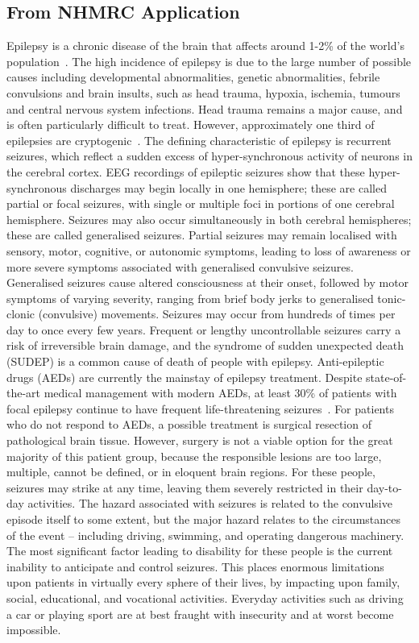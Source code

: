 \documentclass[]{article}
\begin{document}
\subsection{From NHMRC Application}
Epilepsy is a chronic disease of the brain that affects around 1-2\% of the world’s population~\cite{Beran1985,Dua2006}. The high incidence of epilepsy is due to the large number of possible causes including developmental abnormalities, genetic abnormalities, febrile convulsions and brain insults, such as head trauma, hypoxia, ischemia, tumours and central nervous system infections. Head trauma remains a major cause, and is often particularly difficult to treat. However, approximately one third of epilepsies are cryptogenic~\cite{Theodore2006}.
The defining characteristic of epilepsy is recurrent seizures, which reflect a sudden excess of hyper-synchronous activity of neurons in the cerebral cortex. EEG recordings of epileptic seizures show that these hyper-synchronous discharges may begin locally in one hemisphere; these are called partial or focal seizures, with single or multiple foci in portions of one cerebral hemisphere. Seizures may also occur simultaneously in both cerebral hemispheres; these are called generalised seizures. Partial seizures may remain localised with sensory, motor, cognitive, or autonomic symptoms, leading to loss of awareness or more severe symptoms associated with generalised convulsive seizures. Generalised seizures cause altered consciousness at their onset, followed by motor symptoms of varying severity, ranging from brief body jerks to generalised tonic-clonic (convulsive) movements. Seizures may occur from hundreds of times per day to once every few years. Frequent or lengthy uncontrollable seizures carry a risk of irreversible brain damage, and the syndrome of sudden unexpected death (SUDEP) is a common cause of death of people with epilepsy.
Anti-epileptic drugs (AEDs) are currently the mainstay of epilepsy treatment. Despite state-of-the-art medical management with modern AEDs, at least 30\% of patients with focal epilepsy continue to have frequent life-threatening seizures~\cite{Schmidt2005}. For patients who do not respond to AEDs, a possible treatment is surgical resection of pathological brain tissue.  However, surgery is not a viable option for the great majority of this patient group, because the responsible lesions are too large, multiple, cannot be defined, or in eloquent brain regions. For these people, seizures may strike at any time, leaving them severely restricted in their day-to-day activities. The hazard associated with seizures is related to the convulsive episode itself to some extent, but the major hazard relates to the circumstances of the event – including driving, swimming, and operating dangerous machinery. The most significant factor leading to disability for these people is the current inability to anticipate and control seizures. This places enormous limitations upon patients in virtually every sphere of their lives, by impacting upon family, social, educational, and vocational activities. Everyday activities such as driving a car or playing sport are at best fraught with insecurity and at worst become impossible.
\end{document}
